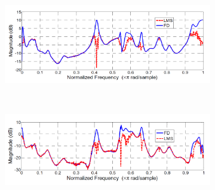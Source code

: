 \documentclass[12pt,a4paper,titlepage]{article}
\begin{document}
\begin{figure}[h]
	\centering	
	\begin{subfigure}{1\textwidth}
		\includegraphics[width=1\textwidth]{Immagini/H11_paper}
		\caption{}
		\label{fig:Confronto_H11_LMS_FD_paper}
	\end{subfigure}\\
	\begin{subfigure}{1\textwidth}
		\includegraphics[width=1\textwidth]{Immagini/H12_paper}
		\caption{}
		\label{fig:Confronto_H12_LMS_FD_paper}
	\end{subfigure}	
\end{figure}
	
\end{document}

